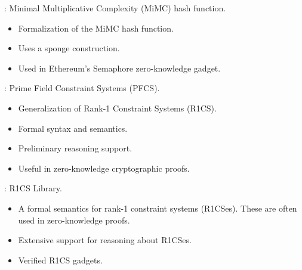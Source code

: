 
\begin{frame}

\newlibtitle

:
Minimal Multiplicative Complexity (MiMC) hash function.
\begin{itemize}
\item Formalization of the MiMC hash function.
\item Uses a sponge construction.
\item Used in Ethereum's Semaphore zero-knowledge gadget.
\end{itemize}

\end{frame}


\begin{frame}

\newlibtitle

:
Prime Field Constraint Systems (PFCS).
\begin{itemize}
\item Generalization of Rank-1 Constraint Systems (R1CS).
\item Formal syntax and semantics.
\item Preliminary reasoning support.
\item Useful in zero-knowledge cryptographic proofs.
\end{itemize}

\end{frame}


\begin{frame}

\newlibtitle

: R1CS Library.
\begin{itemize}
\item A formal semantics for rank-1 constraint systems (R1CSes). These
  are often used in zero-knowledge proofs.
\item Extensive support for reasoning about R1CSes.
\item Verified R1CS gadgets.
\end{itemize}

\end{frame}

